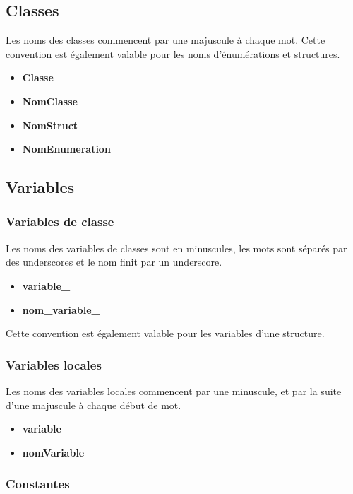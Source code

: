 \documentclass[]{article}
\begin{document}
\subsection{Classes}

Les noms des classes commencent par une majuscule à chaque mot.
Cette convention est également valable pour les noms 
d'énumérations et structures.

\begin{itemize}
	\item \textbf{Classe}
	\item \textbf{NomClasse}
	\item \textbf{NomStruct}
	\item \textbf{NomEnumeration}
\end{itemize}

\newpage

\subsection{Variables}

\subsubsection{Variables de classe}

Les noms des variables de classes sont en minuscules, les mots sont 
séparés par des underscores et le nom finit par un underscore.

\begin{itemize}
	\item \textbf{variable\_}
	\item \textbf{nom\_variable\_}
\end{itemize}

Cette convention est également valable pour les variables d'une
structure.

\subsubsection{Variables locales}

Les noms des variables locales commencent par une minuscule, et par
la suite d'une majuscule à chaque début de mot.

\begin{itemize}
	\item \textbf{variable}
	\item \textbf{nomVariable}
\end{itemize}

\subsubsection{Constantes}
\end{document}
